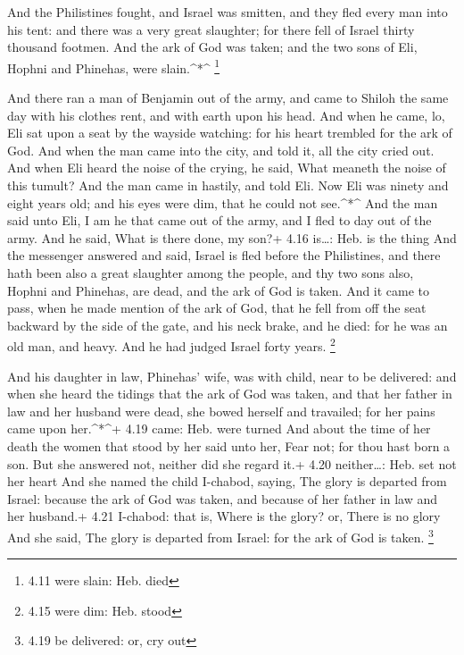  And the Philistines fought, and Israel was smitten, and
they fled every man into his tent: and there was a very great slaughter;
for there fell of Israel thirty thousand footmen.  And the
ark of God was taken; and the two sons of Eli, Hophni and Phinehas, were
slain.\^{}*\^{} \footnote{4.11 were slain: Heb. died}

 And there ran a man of Benjamin out of the army, and came
to Shiloh the same day with his clothes rent, and with earth upon his
head.  And when he came, lo, Eli sat upon a seat by the
wayside watching: for his heart trembled for the ark of God. And when
the man came into the city, and told it, all the city cried out.
 And when Eli heard the noise of the crying, he said, What
meaneth the noise of this tumult? And the man came in hastily, and told
Eli.  Now Eli was ninety and eight years old; and his eyes
were dim, that he could not see.\^{}*\^{}  And the man said
unto Eli, I am he that came out of the army, and I fled to day out of
the army. And he said, What is there done, my son?+ 4.16 is\ldots: Heb.
is the thing  And the messenger answered and said, Israel
is fled before the Philistines, and there hath been also a great
slaughter among the people, and thy two sons also, Hophni and Phinehas,
are dead, and the ark of God is taken.  And it came to
pass, when he made mention of the ark of God, that he fell from off the
seat backward by the side of the gate, and his neck brake, and he died:
for he was an old man, and heavy. And he had judged Israel forty years.
\footnote{4.15 were dim: Heb. stood}

 And his daughter in law, Phinehas' wife, was with child,
near to be delivered: and when she heard the tidings that the ark of God
was taken, and that her father in law and her husband were dead, she
bowed herself and travailed; for her pains came upon her.\^{}*\^{}+ 4.19
came: Heb. were turned  And about the time of her death the
women that stood by her said unto her, Fear not; for thou hast born a
son. But she answered not, neither did she regard it.+ 4.20
neither\ldots: Heb. set not her heart  And she named the
child I-chabod, saying, The glory is departed from Israel: because the
ark of God was taken, and because of her father in law and her husband.+
4.21 I-chabod: that is, Where is the glory? or, There is no glory
 And she said, The glory is departed from Israel: for the
ark of God is taken. \footnote{4.19 be delivered: or, cry out}

